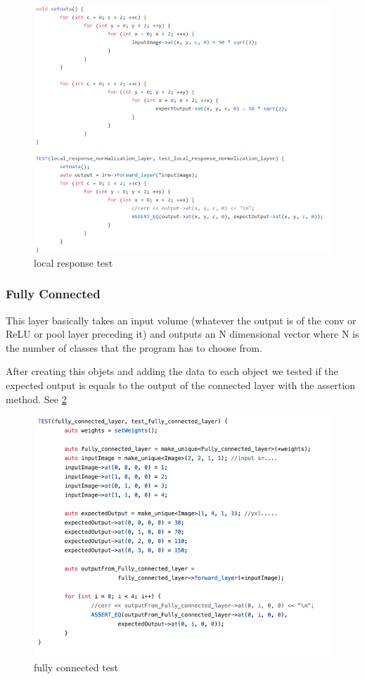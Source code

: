 \documentclass[parskip=full]{scrartcl}
\begin{document}
\begin{figure}[h]
		\centering
		\includegraphics[width=1\textwidth]{local_response_test}
		\caption{local response test}
		\label{fig:local_response_test}
\end{figure}

\subsubsection{Fully Connected}
This layer basically takes an input volume (whatever the output is of the conv or ReLU or pool layer preceding it) and outputs an N dimensional vector where N is the number of classes that the program has to choose from.

After creating this objets and adding the data to each object we tested if the expected output is equals to the output of the connected layer with the assertion method. See \ref{fig:fully_connected_test} %

\begin{figure}[h]
		\centering
		\includegraphics[width=1\textwidth]{fully_connected_test}
		\caption{fully connected test}
		\label{fig:fully_connected_test}
\end{figure}
\end{document}
